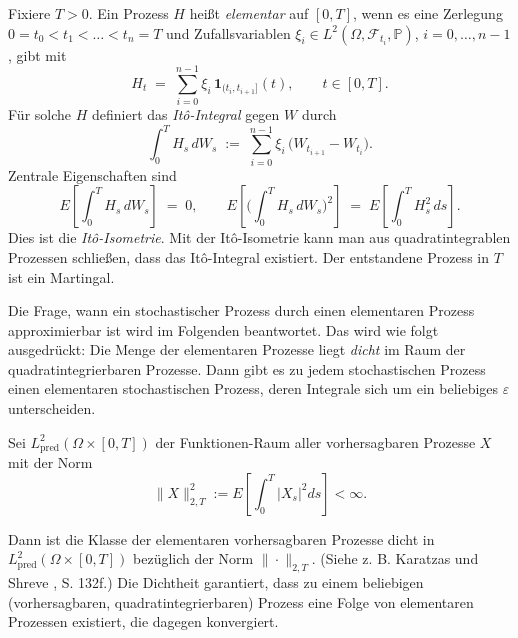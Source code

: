 \begin{defi}
Fixiere $T>0$. Ein Prozess $H$ heißt \emph{elementar} auf $[0,T]$, wenn es eine 
Zerlegung $0=t_0<t_1<\dots<t_n=T$ und Zufallsvariablen $\xi_i\in L^2(\Omega,\mathcal F_{t_i},\mathbb P)$, $i=0,\dots,n-1$, gibt mit
$$
H_t \;=\; \sum_{i=0}^{n-1} \xi_i\,\mathbf 1_{(t_i,t_{i+1}]}(t),\qquad t\in[0,T].
$$
Für solche $H$ definiert das \emph{It\^o-Integral} gegen $W$ durch
$$
\int_0^T H_s\,dW_s \;:=\; \sum_{i=0}^{n-1} \xi_i\,\big(W_{t_{i+1}}-W_{t_i}\big).
$$
Zentrale Eigenschaften sind
\begin{equation}\label{eq:ito_isometry}
E\!\left[\int_0^T H_s\,dW_s\right] \;=\; 0,\qquad
E\!\left[\Big(\int_0^T H_s\,dW_s\Big)^{\!2}\right] \;=\; E\!\left[\int_0^T H_s^2\,ds\right].
\end{equation}
Dies ist die \emph{It\^o-Isometrie}. Mit der It\^o-Isometrie kann man aus quadratintegrablen Prozessen
schließen, dass das It\^o-Integral existiert. Der entstandene Prozess in $T$ ist ein Martingal.
\end{defi}

\begin{satz}
Die Frage, wann ein stochastischer Prozess durch einen elementaren Prozess approximierbar ist wird im Folgenden 
beantwortet. Das wird wie folgt ausgedrückt: Die Menge der elementaren Prozesse liegt \textit{dicht} im Raum
der quadratintegrierbaren Prozesse. Dann gibt es zu jedem stochastischen Prozess einen elementaren stochastischen
Prozess, deren Integrale sich um ein beliebiges $\varepsilon$ unterscheiden.

Sei $L^2_{\mathrm{pred}}(\Omega\times[0,T])$ der Funktionen-Raum aller vorhersagbaren Prozesse $X$ mit der Norm
\begin{equation}\label{eq:ito_norm}
\|X\|_{2,T}^2 := E \left [ \int_0^T |X_s|^2 ds \right ] < \infty.  
\end{equation}

Dann ist die Klasse der elementaren vorhersagbaren Prozesse dicht 
in $L^2_{\mathrm{pred}}(\Omega\times[0,T])$ bezüglich der Norm $\|\cdot\|_{2,T}$. (Siehe z. B. Karatzas und Shreve \cite{karatzas_brownian_1991}, S. 132f.) 
Die Dichtheit garantiert, dass zu einem beliebigen (vorhersagbaren, quadratintegrierbaren) Prozess 
eine Folge von elementaren Prozessen existiert, die dagegen konvergiert.
\end{satz}

